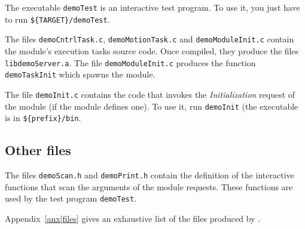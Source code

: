 The executable \texttt{demoTest} is an interactive test program. To use it,
you just have to  run
\texttt{\$\{TARGET\}/demoTest}.

The  files    \texttt{demoCntrlTask.c},   \texttt{demoMotionTask.c}    and 
\texttt{demoModuleInit.c} contain the module's execution tasks source code.  Once
compiled, they produce the  files  
\texttt{libdemoServer.a}.  The   file  \texttt{demoModuleInit.c} produces    the
function \texttt{demoTaskInit} which spawns the module.

The file \texttt{demoInit.c} contains the code that invokes the {\em
Initialization} request of the module (if the module defines one). To use
it, run \texttt{demoInit} (the executable is in 
\texttt{\$\{prefix\}/bin}.


\subsection{Other files}

The  files \texttt{demoScan.h} and \texttt{demoPrint.h} contain the definition
of  the interactive   functions  that scan  the  arguments  of the module
requests. These functions are used by the test program \texttt{demoTest}.

Appendix~\ref{anx|files} gives an exhaustive list  of the files  produced
by \GenoM.
